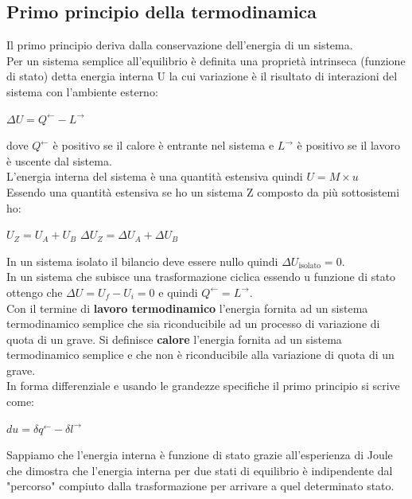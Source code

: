 \documentclass[a4paper,12pt,titlepage]{article}
\begin{document}
\subsection{Primo principio della termodinamica}
Il primo principio deriva dalla conservazione dell'energia di un sistema.\\
Per un sistema semplice all'equilibrio è definita una proprietà intrinseca (funzione di stato) detta energia interna U la cui variazione è il risultato di interazioni del sistema con l'ambiente esterno:
\begin{center}
$\varDelta U = Q^{\leftarrow}-L^{\rightarrow}$ 
\end{center}
dove $Q^{\leftarrow}$ è positivo se il calore è entrante nel sistema e
$L^{\rightarrow}$ è positivo se il lavoro è uscente dal sistema.\\
L'energia interna del sistema è una quantità estensiva quindi $U = M \times u$\\
Essendo una quantità estensiva se ho un sistema Z composto da più sottosistemi ho:
\begin{center}
$U_{Z} = U_{A} + U_{B} $
$\varDelta U_{Z} = \varDelta U_{A} + \varDelta U_{B}$
\end{center}
In un sistema isolato il bilancio deve essere nullo quindi $\varDelta U_{\text{isolato}} = 0$.\\
In un sistema che subisce una trasformazione ciclica essendo u funzione di stato ottengo che $\varDelta U = U_{f} - U_{i} = 0$ e quindi $Q^{\leftarrow} = L^{\rightarrow}$.\\

Con il termine di \textbf{lavoro termodinamico} l’energia fornita ad un sistema termodinamico semplice che sia riconducibile ad un processo di variazione di quota di un grave. Si definisce \textbf{calore} l’energia fornita ad un sistema termodinamico semplice e che non è riconducibile alla variazione di quota di un grave.\\
In forma differenziale e usando le grandezze specifiche il primo principio si scrive come:
\begin{center}
$du = \delta q^{\leftarrow} - \delta l^{\rightarrow}$
\end{center}
Sappiamo che l'energia interna è funzione di stato grazie all'esperienza di Joule che dimostra che l'energia interna per due stati di equilibrio è indipendente dal "percorso" compiuto dalla trasformazione per arrivare a quel determinato stato.
\end{document}
